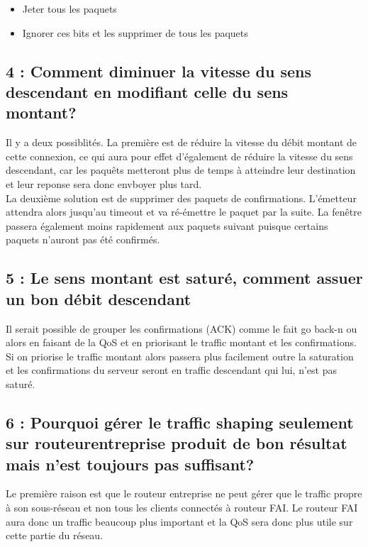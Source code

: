 \documentclass{article}
\begin{document}
\begin{itemize}
 	\item Jeter tous les paquets
 	\item Ignorer ces bits et les supprimer de tous les paquets
\end{itemize}

\subsection*{4 : Comment diminuer la vitesse du sens descendant en modifiant celle du sens montant?}

Il y a deux possiblités. La première est de réduire la vitesse du débit montant de cette connexion, ce qui aura pour effet d'également de réduire la vitesse du sens descendant, car les paquêts metteront plus de temps à atteindre leur destination et leur reponse sera donc envboyer plus tard.\\

La deuxième solution  est de supprimer des paquets de confirmations. L'émetteur attendra alors jusqu'au timeout et va ré-émettre le paquet par la suite. La fenêtre passera également moins rapidement aux paquets suivant puisque certains paquets n'auront pas été confirmés.

\subsection*{5 : Le sens montant est saturé, comment assuer un bon débit descendant}

Il serait possible de grouper les confirmations (ACK) comme le fait go back-n\cite{GoBackN} ou alors en faisant de la QoS et en priorisant le traffic montant et les confirmations.\\

Si on priorise le traffic montant alors passera plus facilement outre la saturation et les confirmations du serveur seront en traffic descendant qui lui, n'est pas saturé.


\subsection*{6 : Pourquoi gérer le traffic shaping seulement sur routeurentreprise produit de bon résultat mais n'est toujours pas suffisant?}

Le première raison est que le routeur entreprise ne peut gérer que le traffic propre à son sous-réseau et non tous les clients connectés à routeur FAI. Le routeur FAI aura donc un traffic beaucoup plus important et la QoS sera donc plus utile sur cette partie du réseau.\\
\end{document}
